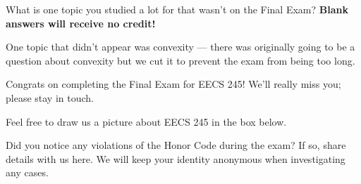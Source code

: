 \documentclass[11pt]{article}
\begin{document}










\newpage

\begin{prob}[(4 pts)]
What is one topic you studied a lot for that wasn't on the Final Exam? \textbf{Blank answers will receive no credit!}

\emptybox{4cm}
\begin{solution}
One topic that didn't appear was convexity --- there was originally going to be a question about convexity but we cut it to prevent the exam from being too long.
\end{solution}
\end{prob}

Congrats on completing the Final Exam for EECS 245! We'll really miss you; please stay in touch.

Feel free to draw us a picture about EECS 245 in the box below. 

\emptybox{8cm}

\vfill

Did you notice any violations of the Honor Code during the exam? If so, share details with us here. We will keep your identity anonymous when investigating any cases.

\emptybox{3cm}
\end{document}
